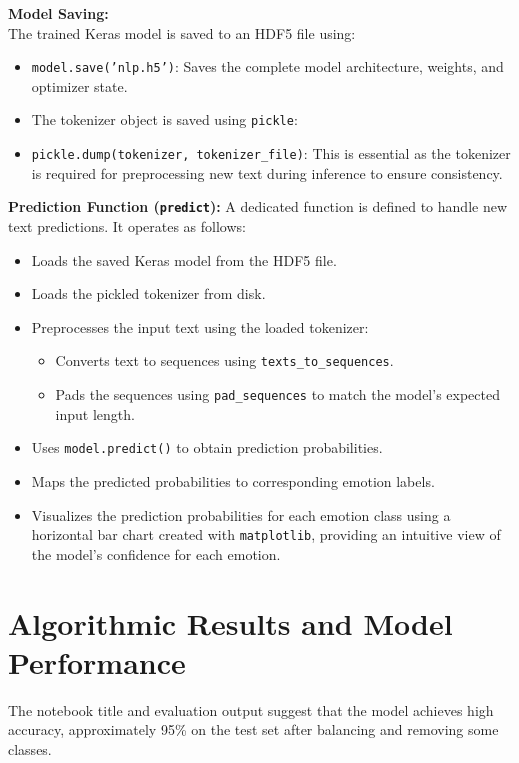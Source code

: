 \documentclass[twocolumn]{article}
\begin{document}
\vspace{0.5em}
\textbf{Model Saving:} \\
The trained Keras model is saved to an HDF5 file using:
\begin{itemize}
    \item \texttt{model.save('nlp.h5')}: Saves the complete model architecture, weights, and optimizer state.
    \item The tokenizer object is saved using \texttt{pickle}:
    \item \texttt{pickle.dump(tokenizer, tokenizer\_file)}: This is essential as the tokenizer is required for preprocessing new text during inference to ensure consistency.
\end{itemize}

\vspace{0.5em}
\textbf{Prediction Function (\texttt{predict}):}
A dedicated function is defined to handle new text predictions. It operates as follows:
\begin{itemize}
    \item Loads the saved Keras model from the HDF5 file.
    \item Loads the pickled tokenizer from disk.
    \item Preprocesses the input text using the loaded tokenizer:
    \begin{itemize}
        \item Converts text to sequences using \texttt{texts\_to\_sequences}.
        \item Pads the sequences using \texttt{pad\_sequences} to match the model’s expected input length.
    \end{itemize}
    \item Uses \texttt{model.predict()} to obtain prediction probabilities.
    \item Maps the predicted probabilities to corresponding emotion labels.
    \item Visualizes the prediction probabilities for each emotion class using a horizontal bar chart created with \texttt{matplotlib}, providing an intuitive view of the model's confidence for each emotion.
\end{itemize}

\section{Algorithmic Results and Model Performance}

\vspace{0.5em}
The notebook title and evaluation output suggest that the model achieves high accuracy, approximately 95\% on the test set after balancing and removing some classes.
\end{document}
